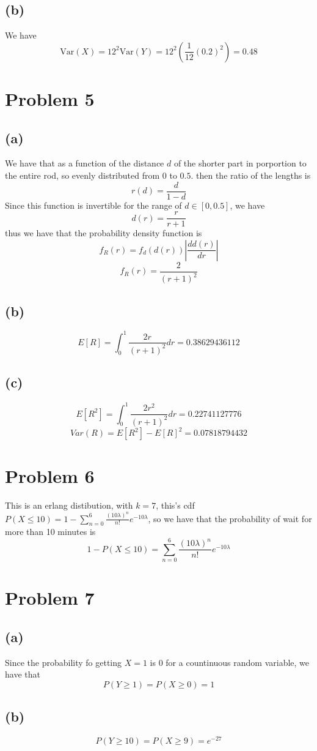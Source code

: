\subsection*{(b)}
We have
$$\text{Var}(X)=12^2\text{Var}(Y)=12^2\left(\frac{1}{12}(0.2)^2\right)=0.48$$
\section*{Problem 5}
\subsection*{(a)}
We have that as a function of the distance $d$ of the shorter part in porportion
to the entire rod,
so evenly distributed from $0$ to $0.5$. then the ratio of the lengths is
$$r(d)=\frac{d}{1-d}$$ 
Since this function is invertible for the range of $d\in[0,0.5]$, we have
$$d(r)=\frac{r}{r+1}$$
thus we have that the probability density function is
$$f_R(r)=f_d(d(r))\left|\frac{d d(r)}{dr}\right|$$
$$f_R(r)=\boxed{\frac{2}{(r+1)^2}}$$
\subsection*{(b)}
$$E[R]=\int_{0}^{1}\frac{2r}{(r+1)^2}dr=0.38629436112$$
\subsection*{(c)}
$$E[R^2]=\int_{0}^{1}\frac{2r^2}{(r+1)^2}dr=0.22741127776$$
$$Var(R)=E[R^2]-E[R]^2=\boxed{0.07818794432}$$
\section*{Problem 6}
This is an erlang distibution, with $k=7$, this's cdf 
$P(X\leq 10)=1-\sum_{n=0}^{6}\frac{(10\lambda)^n}{n!}e^{-10\lambda}$, so we have
that the probability of wait for more than 10 minutes is
$$1-P(X\leq 10)=\boxed{\sum_{n=0}^{6}\frac{(10\lambda)^n}{n!}e^{-10\lambda}}$$
\section*{Problem 7}
\subsection*{(a)}
Since the probability fo getting $X=1$ is $0$ for a countinuous random variable,
we have that 
$$P(Y\geq1)=P(X\geq0)=\boxed{1}$$
\subsection*{(b)}
$$P(Y\geq10)=P(X\geq9)=\boxed{e^{-27}}$$
